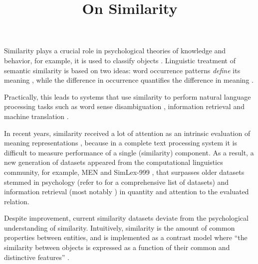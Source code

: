 \documentclass[11pt]{article}
\title{On Similarity}
\date{}
\begin{document}
\maketitle



Similarity plays a crucial role in psychological theories of knowledge and behavior, for example, it is used to classify objects \cite{Tversky1977}.
%
Linguistic treatment of semantic similarity is based on two ideas: word occurrence patterns \emph{define} its meaning \cite{firth1957lingtheory}, while the difference in occurrence \textup{quantifies} the difference in meaning \cite{harris1954distributional}.

Practically, this leads to systems that use similarity to perform natural language processing tasks such as word sense disambiguation \cite{Schutze:1998:AWS:972719.972724}, information retrieval \cite{Salton:1975:VSM:361219.361220} and machine translation \cite{Dagan:1993:CWS:981574.981596}.

In recent years, similarity received a lot of attention as an intrinsic evaluation of meaning representations \cite{mikolov2013efficient,Bruni:2012:DST:2390524.2390544}, because in a complete text processing system it is difficult to measure performance of a single (similarity) component. As a result, a new generation of datasets appeared from the computational linguistics community, for example, MEN \cite{Bruni:2012:DST:2390524.2390544} and SimLex-999 \cite{hill2014simlex}, that surpasses older datasets stemmed in psychology (refer to  for a comprehensive list of datasets) and information retrieval (most notably ) in quantity and attention to the evaluated relation.

Despite improvement, current similarity datasets deviate from the psychological understanding of similarity. Intuitively, similarity is the amount of common properties between entities, and is implemented as a contrast model where ``the similarity between objects is expressed as a function of their common and distinctive features'' \cite{Tversky1977}.
\end{document}
